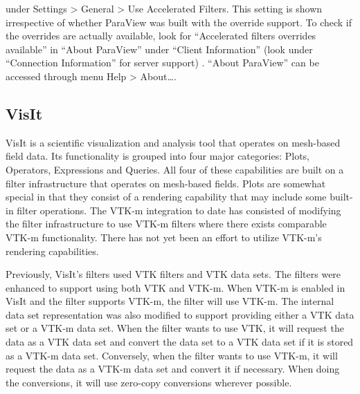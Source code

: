 under Settings > General > Use Accelerated Filters. This setting is shown irrespective of whether ParaView was built with the override support. To check if the overrides are actually available, look for “Accelerated filters overrides available” in “About ParaView” under “Client Information” (look under “Connection Information” for server support) . “About ParaView” can be accessed through menu Help > About….

\subsection{VisIt}

VisIt is a scientific visualization and analysis tool that operates on mesh-based field data. Its functionality is grouped into four major categories: Plots, Operators, Expressions and Queries. All four of these capabilities are built on a filter infrastructure that operates on mesh-based fields. Plots are somewhat special in that they consist of a rendering capability that may include some built-in filter operations. The VTK-m integration to date has consisted of modifying the filter infrastructure to use VTK-m filters where there exists comparable VTK-m functionality. There has not yet been an effort to utilize VTK-m’s rendering capabilities.

Previously, VisIt’s filters used VTK filters and VTK data sets. The filters were enhanced to support using both VTK and VTK-m. When VTK-m is enabled in VisIt and the filter supports VTK-m, the filter will use VTK-m. The internal data set representation was also modified to support providing either a VTK data set or a VTK-m data set. When the filter wants to use VTK, it will request the data as a VTK data set and convert the data set to a VTK data set if it is stored as a VTK-m data set. Conversely, when the filter wants to use VTK-m, it will request the data as a VTK-m data set and convert it if necessary. When doing the conversions, it will use zero-copy conversions wherever possible.

